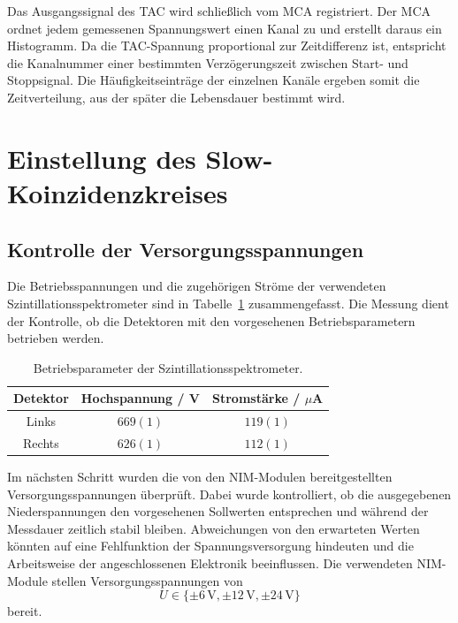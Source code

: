 Das Ausgangssignal des TAC wird schließlich vom MCA registriert. 
Der MCA ordnet jedem gemessenen Spannungswert einen Kanal zu und erstellt daraus ein Histogramm. 
Da die TAC-Spannung proportional zur Zeitdifferenz ist, entspricht die Kanalnummer einer bestimmten Verzögerungszeit zwischen Start- und Stoppsignal. 
Die Häufigkeitseinträge der einzelnen Kanäle ergeben somit die Zeitverteilung, aus der später die Lebensdauer bestimmt wird.

\section{Einstellung des Slow-Koinzidenzkreises}
\subsection{Kontrolle der Versorgungsspannungen}

Die Betriebsspannungen und die zugehörigen Ströme der verwendeten Szintillationsspektrometer sind in Tabelle~\ref{tab:betrieb} zusammengefasst. 
Die Messung dient der Kontrolle, ob die Detektoren mit den vorgesehenen Betriebsparametern betrieben werden. 
\begin{table}[htbp] 
    \centering 
    \caption{Betriebsparameter der Szintillationsspektrometer.} 
    \label{tab:betrieb} 
    \begin{tabular}{ccc} 
        \hline 
        Detektor & Hochspannung / V & Stromstärke / $\mu$A \\ 
        \hline 
        Links & $669(1)$ & $119(1)$ \\ 
        Rechts & $626(1)$ & $112(1)$ \\ 
        \hline 
    \end{tabular} 
\end{table} 

Im nächsten Schritt wurden die von den NIM-Modulen bereitgestellten Versorgungsspannungen überprüft. 
Dabei wurde kontrolliert, ob die ausgegebenen Niederspannungen den vorgesehenen Sollwerten entsprechen und während der Messdauer zeitlich stabil bleiben. 
Abweichungen von den erwarteten Werten könnten auf eine Fehlfunktion der Spannungsversorgung hindeuten und die Arbeitsweise der angeschlossenen Elektronik beeinflussen. 
Die verwendeten NIM-Module stellen Versorgungsspannungen von \[ U \in \{\pm 6\,\mathrm{V},\pm 12\,\mathrm{V},\pm 24\,\mathrm{V}\} \] bereit. 

